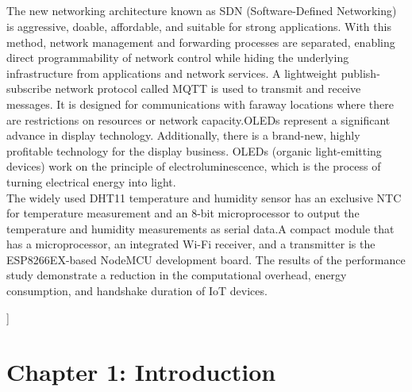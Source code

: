 \documentclass[12pt,a4paper,twocolumn,fleqn]{article}
\makeatletter
\renewenvironment{abstract}{%
    \if@twocolumn
      \section*{\abstractname}%
    \else %
      \begin{center}%
        {\bfseries \Large\abstractname\vspace{\z@}}%
      \end{center}%
      \quotation
    \fi}
    {\if@twocolumn\else\endquotation\fi}
\makeatother
\begin{document}
\begin{@twocolumnfalse}
\begin{abstract}
The new networking architecture known as SDN (Software-Defined Networking) is aggressive, doable, affordable, and suitable for strong applications. With this method, network management and forwarding processes are separated, enabling direct programmability of network control while hiding the underlying infrastructure from applications and network services. A lightweight publish-subscribe network protocol called MQTT is used to transmit and receive messages. It is designed for communications with faraway locations where there are restrictions on resources or network capacity.OLEDs represent a significant advance in display technology. Additionally, there is a brand-new, highly profitable technology for the display business. OLEDs (organic light-emitting devices) work on the principle of electroluminescence, which is the process of turning electrical energy into light. \\

The widely used DHT11 temperature and humidity sensor has an exclusive NTC for temperature measurement and an 8-bit microprocessor to output the temperature and humidity measurements as serial data.A compact module that has a microprocessor, an integrated Wi-Fi receiver, and a transmitter is the ESP8266EX-based NodeMCU development board. The results of the performance study demonstrate a reduction in the computational overhead, energy consumption, and handshake duration of IoT devices.
\end{abstract}
\end{@twocolumnfalse}]
\linenumbers
\nolinenumbers
\onecolumn
\newpage
  \pagestyle{fancy}
  \fancyhf{}
\renewcommand{\headrulewidth}{0pt}
\tableofcontents
\newpage
  \pagestyle{fancy}
  \fancyhf{}
\renewcommand{\headrulewidth}{0pt}
\listoffigures
\newpage
  \pagestyle{fancy}
  \thispagestyle{empty}
  \thispagestyle{plain}
  \fancyhf{}
  \chead{}
  \renewcommand{\headrulewidth}{0.4pt}%
\renewcommand{\footrulewidth}{0.4pt}%
\normalsize
\section{Chapter 1: Introduction}
\end{document}
